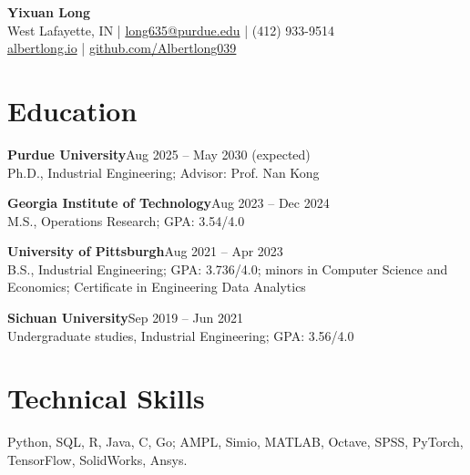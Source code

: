\documentclass[letterpaper,10pt]{article}
\newcommand{\job}[3]{\textbf{#1}\hfill #2\\{\small #3}\par}
\begin{document}
\begin{center}
{\LARGE\bfseries Yixuan Long}\\
West Lafayette, IN \quad | \quad \href{mailto:long635@purdue.edu}{long635@purdue.edu} \quad | \quad (412) 933-9514\\
\href{https://albertlong.io}{albertlong.io} \quad | \quad \href{https://github.com/Albertlong039}{github.com/Albertlong039}
\end{center}
\section{Education}
\job{Purdue University}{Aug 2025 -- May 2030 (expected)}{Ph.D., Industrial Engineering; Advisor: Prof. Nan Kong}
\job{Georgia Institute of Technology}{Aug 2023 -- Dec 2024}{M.S., Operations Research; GPA: 3.54/4.0}
\job{University of Pittsburgh}{Aug 2021 -- Apr 2023}{B.S., Industrial Engineering; GPA: 3.736/4.0; minors in Computer Science and Economics; Certificate in Engineering Data Analytics}
\job{Sichuan University}{Sep 2019 -- Jun 2021}{Undergraduate studies, Industrial Engineering; GPA: 3.56/4.0}
\section{Technical Skills}
Python, SQL, R, Java, C, Go; AMPL, Simio, MATLAB, Octave, SPSS, PyTorch, TensorFlow, SolidWorks, Ansys.
\end{document}
